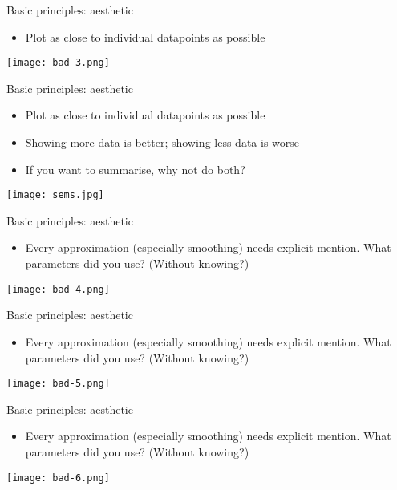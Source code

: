 \documentclass[10pt]{beamer}
\begin{document}
\begin{frame}{Basic principles: aesthetic}
    \begin{itemize}
    \item Plot as close to individual datapoints as possible
    \end{itemize}
    \texttt{[image: bad-3.png]}
\end{frame}
\begin{frame}{Basic principles: aesthetic}
    \begin{itemize}
    \item Plot as close to individual datapoints as possible
    \item Showing more data is better; showing less data is worse
  \item If you want to summarise, why not do both?
    \end{itemize}
 \centering
    \texttt{[image: sems.jpg]}
 
\end{frame}

\begin{frame}{Basic principles: aesthetic}
    \begin{itemize}
    \item Every approximation (especially smoothing) needs explicit mention. What parameters did you use? (Without knowing?)
    \end{itemize}
    \texttt{[image: bad-4.png]}
\end{frame}
\begin{frame}{Basic principles: aesthetic}
    \begin{itemize}
    \item Every approximation (especially smoothing) needs explicit mention. What parameters did you use? (Without knowing?)
    \end{itemize}
    \texttt{[image: bad-5.png]}
\end{frame}
\begin{frame}{Basic principles: aesthetic}
    \begin{itemize}
    \item Every approximation (especially smoothing) needs explicit mention. What parameters did you use? (Without knowing?)
    \end{itemize}
    \texttt{[image: bad-6.png]}
\end{frame}
\end{document}
